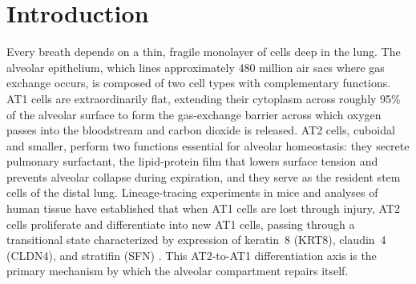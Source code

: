 \documentclass[11pt]{article}
\begin{document}
\begin{abstract}
(ii) We exhaustively audited all eight gene programs for silent reference-matrix dropouts: only the symbol \textit{GPX1} is absent from the SCP1219 reference (the gene locus is present as \textit{GPX2}, \textit{GPX3}, \textit{GPX4}, \textit{GPX7}, and \textit{GPX8}; \textit{GPX1} itself is not present in the published SCP1219 gene name file). No other silent dropouts were detected, so the earlier generic concern that ``other programs may have analogous dropouts'' is retracted. (iii) We replicated the three pre-registered tests in an independent cohort of 89{,}736 alveolar AT1/AT2 nuclei drawn from 35 datasets and 618 donors on the cellxgene census (Melms/SCP1219 dataset identifier explicitly excluded; per-donor cell count capped at 200 to reduce study-dominance). Dispersion replicated strongly (variance ratio $1.65\times$; Levene $p \approx 10^{-137}$); the pseudotime-direction analogue replicated at the donor-pseudobulk level (one-sided Mann--Whitney $p = 2.0 \times 10^{-3}$, 43 COVID donors versus 575 control donors) but not at the cell level (one-sided $p = 1.0$), consistent with the primary finding that coherent displacement is absent and dispersion-dominated structure prevails; marker-threshold-based DATP calling did not transfer cross-cohort. Taken together these results support a reframed model in which lethal COVID-19 fans alveolar epithelial cells outward along a continuous injury axis rather than moving them coherently, a pattern whose strongest and most portable signature is increased within-group dispersion.
\end{abstract}

\section{Introduction}

Every breath depends on a thin, fragile monolayer of cells deep in the lung. The alveolar epithelium, which lines approximately 480 million air sacs where gas exchange occurs, is composed of two cell types with complementary functions. AT1 cells are extraordinarily flat, extending their cytoplasm across roughly 95\% of the alveolar surface to form the gas-exchange barrier across which oxygen passes into the bloodstream and carbon dioxide is released. AT2 cells, cuboidal and smaller, perform two functions essential for alveolar homeostasis: they secrete pulmonary surfactant, the lipid-protein film that lowers surface tension and prevents alveolar collapse during expiration, and they serve as the resident stem cells of the distal lung. Lineage-tracing experiments in mice and analyses of human tissue have established that when AT1 cells are lost through injury, AT2 cells proliferate and differentiate into new AT1 cells, passing through a transitional state characterized by expression of keratin~8 (KRT8), claudin~4 (CLDN4), and stratifin (SFN) \citep{Barkauskas2013, Kobayashi2020, Strunz2020}. This AT2-to-AT1 differentiation axis is the primary mechanism by which the alveolar compartment repairs itself.
\end{document}
